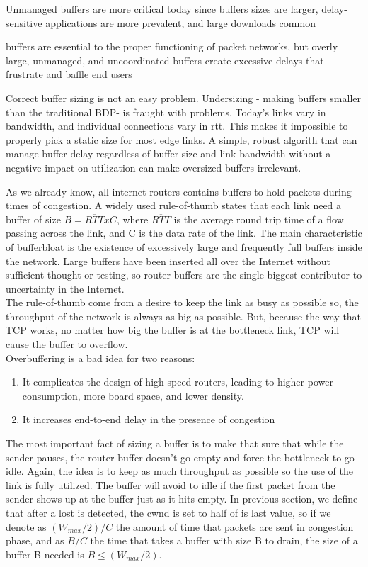 Unmanaged buffers are more critical today since buffers sizes are larger, delay-sensitive applications are more prevalent, and large downloads common

buffers are essential to the proper functioning of packet networks, but overly large, unmanaged, and uncoordinated buffers create excessive delays that frustrate and baffle end users

Correct buffer sizing is not an easy problem. Undersizing - making buffers smaller than the traditional BDP- is fraught with problems. Today's links vary in bandwidth, and individual connections vary in rtt. This makes it impossible to properly pick a static size for most edge links. A simple, robust algorith that can manage buffer delay regardless of buffer size and link bandwidth without a negative impact on utilization can make oversized buffers irrelevant.


As we already know, all internet routers contains buffers to hold packets during times of congestion. A widely used rule-of-thumb states that each link need a buffer of size $B = \overline{RTT} x C $, where $\overline{RTT}$ is the average round trip time of a flow passing across the link, and C is the data rate of the link. The main characteristic of bufferbloat is the existence of excessively large and frequently full buffers inside the network. Large buffers have been inserted all over the Internet without sufficient thought or testing, so router buffers are the single biggest contributor to uncertainty in the Internet.\\

The rule-of-thumb come from a desire to keep the link as busy as possible so, the throughput of the network is always as big as possible. But, because the way that TCP works, no matter how big the buffer is at the bottleneck link, TCP will cause the buffer to overflow.\\ 

Overbuffering is a bad idea for two reasons:
\begin{enumerate}
\item It complicates the design of high-speed routers, leading to higher power consumption, more board space, and lower density.
\item It increases end-to-end delay in the presence of congestion
\end{enumerate}

The most important fact of sizing a buffer is to make that sure that while the sender pauses, the router buffer doesn't go empty and force the bottleneck to go idle. Again, the idea is to keep as much throughput as possible so the use of the link is fully utilized. The buffer will avoid to idle if the first packet from the sender shows up at the buffer just as it hits empty. In previous section, we define that after a lost is detected, the cwnd is set to half of is last value, so if we denote as $(W_{max} /2)/C$ the amount of time that packets are sent in congestion phase, and as $B/C$ the time that takes a buffer with size B to drain, the size of a buffer B needed is $B \leq (W_{max} /2)$.\\

